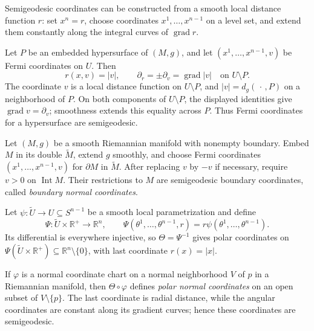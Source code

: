 Semigeodesic coordinates can be constructed from a smooth local distance
function $r$: set $x^n=r$, choose coordinates $x^1,\ldots,x^{n-1}$ on a level
set, and extend them constantly along the integral curves of
$\operatorname{grad}r$.

\begin{example}
\label{ex:fermi-coordinates-hypersurface}

Let $P$ be an embedded hypersurface of $(M,g)$, and let
$(x^1,\ldots,x^{n-1},v)$ be Fermi coordinates on $U$. Then
\[
r(x,v)=|v|,
\qquad
\partial_r=\pm\partial_v=\operatorname{grad}|v|
\quad\text{on }U\setminus P.
\]
The coordinate $v$ is a local distance function on $U\setminus P$, and
$|v|=d_g(\,\cdot\,,P)$ on a neighborhood of $P$. On both components of
$U\setminus P$, the displayed identities give
$\operatorname{grad}v=\partial_v$; smoothness extends this equality across
$P$. Thus Fermi coordinates for a hypersurface are semigeodesic.
\end{example}

\begin{example}
\label{ex:boundary-normal-coordinates}

Let $(M,g)$ be a smooth Riemannian manifold with nonempty boundary. Embed $M$
in its double $\widetilde M$, extend $g$ smoothly, and choose Fermi coordinates
$(x^1,\ldots,x^{n-1},v)$ for $\partial M$ in $\widetilde M$. After replacing
$v$ by $-v$ if necessary, require $v>0$ on $\operatorname{Int}M$. Their
restrictions to $M$ are semigeodesic boundary coordinates, called
\emph{boundary normal coordinates}.
\end{example}

\begin{example}
\label{ex:polar-normal-coordinates}

Let $\psi:\widetilde U\to U\subseteq S^{n-1}$ be a smooth local
parametrization and define
\[
\Psi:\widetilde U\times\mathbb R^+\to\mathbb R^n,
\qquad
\Psi(\theta^1,\ldots,\theta^{n-1},r)=r\psi(\theta^1,\ldots,\theta^{n-1}).
\]
Its differential is everywhere injective, so $\Theta=\Psi^{-1}$ gives polar
coordinates on
$\Psi(\widetilde U\times\mathbb R^+)\subseteq\mathbb R^n\setminus\{0\}$,
with last coordinate $r(x)=|x|$.

If $\varphi$ is a normal coordinate chart on a normal neighborhood $V$ of
$p$ in a Riemannian manifold, then $\Theta\circ\varphi$ defines
\emph{polar normal coordinates} on an open subset of $V\setminus\{p\}$. The
last coordinate is radial distance, while the angular coordinates are constant
along its gradient curves; hence these coordinates are semigeodesic.
\end{example}


